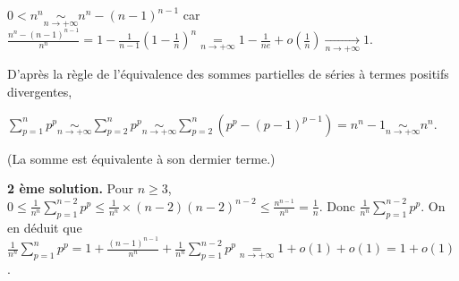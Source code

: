 {{$0< n^n\underset{n\rightarrow+\infty}{\sim} n^n - (n-1)^{n-1}$ car $\frac{n^n - (n-1)^{n-1}}{n^n}=  1-\frac{1}{n-1}\left(1-\frac{1}{n}\right)^{n}\underset{n\rightarrow+\infty}{=}1-\frac{1}{ne}+o\left(\frac{1}{n}\right)\underset{n\rightarrow+\infty}{\rightarrow}1$.

D'après la règle de l'équivalence des sommes partielles de séries à termes positifs divergentes,

\begin{center}
$\sum_{p=1}^{n}p^p\underset{n\rightarrow+\infty}{\sim}\sum_{p=2}^{n}p^p\underset{n\rightarrow+\infty}{\sim}\sum_{p=2}^{n}(p^p-(p-1)^{p-1}) = n^n-1\underset{n\rightarrow+\infty}{\sim}n^n$.
\end{center}

(La somme est équivalente à son dermier terme.)

\textbf{2 ème solution.} Pour $n\geqslant3$, $0\leqslant\frac{1}{n^n}\sum_{p=1}^{n-2}p^p\leqslant\frac{1}{n^n}\times(n-2)(n-2)^{n-2}\leqslant \frac{n^{n-1}}{n^n}=\frac{1}{n}$. Donc $\frac{1}{n^n}\sum_{p=1}^{n-2}p^p$. On en déduit que $\frac{1}{n^n}\sum_{p=1}^{n}p^p=1+\frac{(n-1)^{n-1}}{n^n}+\frac{1}{n^n}\sum_{p=1}^{n-2}p^p\underset{n\rightarrow+\infty}{=}1+o(1)+o(1)=1+o(1)$.

\begin{center}
\end{center}
}
}
